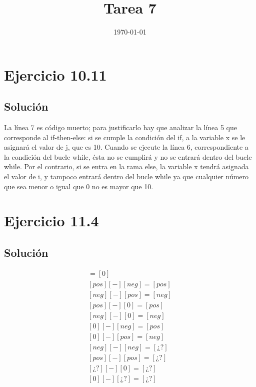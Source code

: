 \documentclass[11pt, a4paper, titlepage]{article}
\begin{document}
\title{Tarea 7}
\date{\today}
\maketitle
\newpage

\section*{Ejercicio 10.11}
\subsection*{Solución}

La línea 7 es código muerto; para justificarlo hay que analizar la línea 5 que
corresponde al if-then-else: si se cumple la condición del if, a la variable x
se le asignará el valor de j, que es 10. Cuando se ejecute la línea 6, correspondiente
a la condición del bucle while, ésta no se cumplirá y no se entrará dentro del bucle
while. Por el contrario, si se entra en la rama else, la variable x tendrá asignada
el valor de i, y tampoco entrará dentro del bucle while ya que cualquier número
que sea menor o igual que 0 no es mayor que 10.

\section*{Ejercicio 11.4}
\subsection*{Solución}
\begin{align*}
  [0] [-] [0] = [0]\\
  [pos] [-] [neg] = [pos]\\
  [neg] [-] [pos] = [neg]\\
  [pos] [-] [0] = [pos]\\
  [neg] [-] [0] = [neg]\\
  [0] [-] [neg] = [pos]\\
  [0] [-] [pos] = [neg]\\
  [neg] [-] [neg] = [\text{¿?}]\\
  [pos] [-] [pos] = [\text{¿?}]\\
  [\text{¿?}] [-] [0] = [\text{¿?}]\\
  [0] [-] [\text{¿?}] = [\text{¿?}]
\end{align*}
\newline
\end{document}
